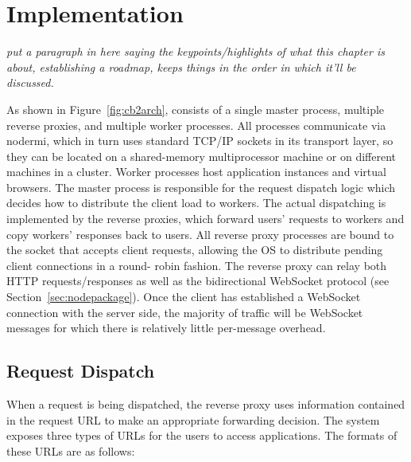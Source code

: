 \chapter{Implementation}
\label{ch:impl}

\emph{put a paragraph in here saying the keypoints/highlights of what this chapter is about,
establishing a roadmap, keeps things in the order in which it'll be discussed.}

As shown in Figure~\ref{fig:cb2arch}, \cbtwo consists of a
single master process, multiple reverse proxies, and multiple worker
processes. All processes communicate via nodermi, which in turn uses standard TCP/IP 
sockets in its transport layer, so they can
be located on a shared-memory multiprocessor machine or on different machines in a cluster. 
Worker processes host application instances and virtual browsers. The master process is responsible for
the request dispatch logic which decides how to distribute the client load to
workers. The actual dispatching is implemented by the reverse proxies, which
forward users' requests to workers and copy workers' responses back to users.
All reverse proxy processes are bound to the socket that accepts client
requests, allowing the OS to distribute pending client connections in a round-
robin fashion.
The reverse proxy can relay both HTTP requests/responses as
well as the bidirectional WebSocket protocol (see Section~\ref{sec:nodepackage}).
Once the client has established a WebSocket connection with
the server side, the majority of traffic will be WebSocket
messages for which there is relatively little per-message overhead.

\newarchitectureoverview{}




\section{Request Dispatch}
\label{sec:reqdis}

When a request is being dispatched, the reverse proxy uses information
contained in the request URL to make an appropriate forwarding decision. 
The system exposes three types of URLs for the users to access \cb applications.
The formats of these URLs are as follows:

